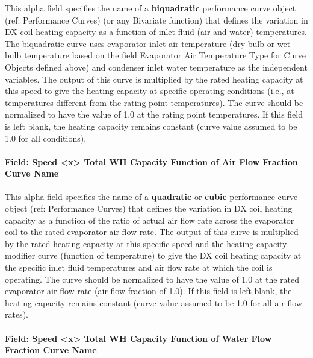 This alpha field specifies the name of a \textbf{biquadratic} performance curve object (ref: Performance Curves) (or any Bivariate function) that defines the variation in DX coil heating capacity as a function of inlet fluid (air and water) temperatures.
The biquadratic curve uses evaporator inlet air temperature (dry-bulb or wet-bulb temperature based on the field Evaporator Air Temperature Type for Curve Objects defined above) and condenser inlet water temperature as the independent variables.
The output of this curve is multiplied by the rated heating capacity at this speed to give the heating capacity at specific operating conditions (i.e., at temperatures different from the rating point temperatures). The curve should be normalized to have the value of 1.0 at the rating point temperatures.
If this field is left blank, the heating capacity remains constant (curve value assumed to be 1.0 for all conditions).

\paragraph{Field: Speed \textless{}x\textgreater{} Total WH Capacity Function of Air Flow Fraction Curve Name}\label{vshpwhheating-speed-x-total-wh-capacity-function-of-air-flow-fraction-curve-name}

This alpha field specifies the name of a \textbf{quadratic} or \textbf{cubic} performance curve object (ref: Performance Curves) that defines the variation in DX coil heating capacity as a function of the ratio of actual air flow rate across the evaporator coil to the rated evaporator air flow rate.
The output of this curve is multiplied by the rated heating capacity at this specific speed and the heating capacity modifier curve (function of temperature) to give the DX coil heating capacity at the specific inlet fluid temperatures and air flow rate at which the coil is operating. The curve should be normalized to have the value of 1.0 at the rated evaporator air flow rate (air flow fraction of 1.0).
If this field is left blank, the heating capacity remains constant (curve value assumed to be 1.0 for all air flow rates).


\paragraph{Field: Speed \textless{}x\textgreater{} Total WH Capacity Function of Water Flow Fraction Curve Name}\label{vshpwhheating-speed-x-total-wh-capacity-function-of-water-flow-fraction-curve-name}

